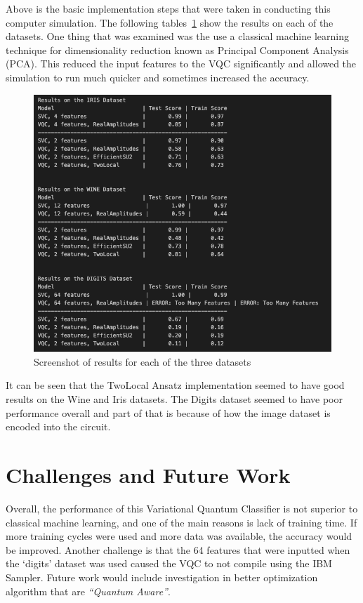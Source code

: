 \documentclass[11pt]{article}
\begin{document}
Above is the basic implementation steps that were taken in conducting this computer simulation. The following tables~\ref{fig:results} show the results on each of the datasets. One thing that 
was examined was the use a classical machine learning technique for dimensionality reduction known as Principal Component Analysis (PCA). 
This reduced the input features to the VQC significantly and allowed the simulation to run much quicker and sometimes increased the accuracy.

\begin{figure}[!ht]
    \centering
    \includegraphics[width=1\textwidth]{./figures/results.png} 
    \caption{Screenshot of results for each of the three datasets}
    \label{fig:results}
\end{figure}

It can be seen that the TwoLocal Ansatz implementation seemed to have good results on the Wine and Iris datasets. The Digits dataset seemed 
to have poor performance overall and part of that is because of how the image dataset is encoded into the circuit. 

\newpage
\section{Challenges and Future Work}

Overall, the performance of this Variational Quantum Classifier is not superior to classical machine learning, and one of the main reasons is lack of training time. If more 
training cycles were used and more data was available, the accuracy would be improved. Another challenge is that the 64 features that were inputted
when the `digits' dataset was used caused the VQC to not compile using the IBM Sampler. 
 Future work would include investigation in better optimization algorithm that are 
\textit{``Quantum Aware''}. 
\end{document}
